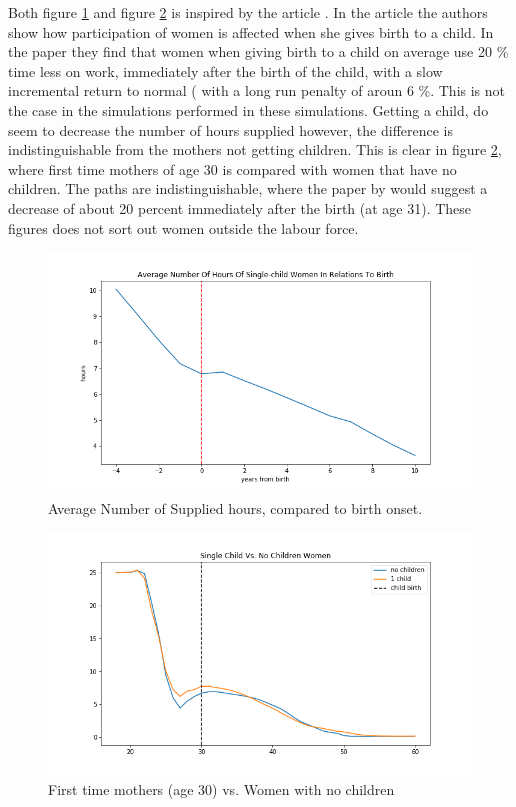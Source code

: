 Both figure \ref{fig:dqi_model1_birth_onset} and figure \ref{fig:dqi_model1_child_vs_no_child_30} is inspired by the article \parencite{kleven_children_2019}. In the article the authors show how participation of women is affected when she gives birth to a child. In the paper they find that women  when giving birth to a child on average use 20 \% time less on work, immediately after the birth of the child, with a slow incremental return to normal ( with a long run penalty of aroun 6 \%. This is not the case in the simulations performed in these simulations. Getting a child, do seem to decrease the number of hours supplied however, the difference is indistinguishable from the mothers not getting children. This is clear in figure \ref{fig:dqi_model1_child_vs_no_child_30}, where first time mothers of age 30 is compared with women that have no children. The paths are indistinguishable, where the paper by \parencite{kleven_children_2019} would suggest a decrease of about 20 percent immediately after the birth (at age 31). These figures does not sort out women outside the labour force.


\begin{figure}
    \centering
    \includegraphics[scale=0.4]{figures/women_supplied_hours_dqi_model1_birth_onset.png}
    \caption{Average Number of Supplied hours, compared to birth onset.}
    \label{fig:dqi_model1_birth_onset}
\end{figure}


\begin{figure}
    \centering
    \includegraphics[scale=0.4]{figures/dqi_single_child_vs_no_child_model1.png}
    \caption{First time mothers (age 30) vs. Women with no children}
    \label{fig:dqi_model1_child_vs_no_child_30}
\end{figure}


